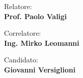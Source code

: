 \begin{titlepage}
	\begin{minipage}[t]{0.47\textwidth}
		{\normalsize{Relatore:}{\normalsize\vspace{3mm} \bf\\ \normalsize{Prof. Paolo Valigi\\ }}}
		
		\vspace{1mm}
		
		{\normalsize{Correlatore:}{\normalsize\vspace{3mm} \bf\\ \normalsize{Ing. Mirko Leomanni\\ }}}
	\end{minipage}
	\hfill
	\begin{minipage}[t]{0.47\textwidth}\raggedleft
		{\normalsize{Candidato:}{\normalsize\vspace{3mm} \bf\\ \normalsize{Giovanni Versiglioni\\ }}}
	\end{minipage}

	\vspace{20mm}
	
	\hrulefill
	\\

\end{titlepage}
      
